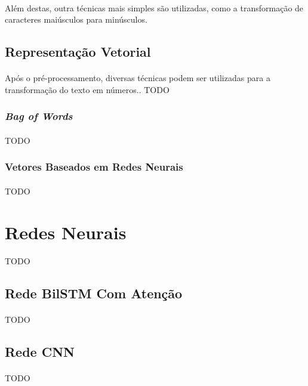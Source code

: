 \documentclass[grad,numbers]{coppe}
\begin{document}
  	\paragraph{}Além destas, outra técnicas mais simples são utilizadas, como a transformação de caracteres maiúsculos para minúsculos.
  	\subsection{Representação Vetorial}
  		\paragraph{}Após o pré-processamento, diversas técnicas podem ser utilizadas para a transformação do texto em números.. TODO
  		\subsubsection{\textit{Bag of Words}}
	  		\paragraph{}TODO
  		\subsubsection{Vetores Baseados em Redes Neurais}
  			\paragraph{}TODO
	  	
  \section{Redes Neurais}
  	\paragraph{}TODO
  	\subsection{Rede BilSTM Com Atenção}
	  	\paragraph{}TODO
  	\subsection{Rede CNN}
  		\paragraph{}TODO
  
\end{document}
